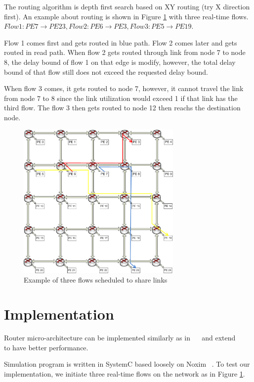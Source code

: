 \documentclass[conference, twocolumn]{IEEEtran}
\theoremstyle{definition}
\begin{document}
The routing algorithm is depth first search based on XY routing (try X
direction first). An example about routing is shown in Figure
\ref{fig:3FlowsEx} with three real-time flows. $Flow 1: PE7 \rightarrow
PE23, Flow 2: PE6 \rightarrow PE3, Flow 3: PE5 \rightarrow PE19$.

Flow 1 comes first and gets routed in blue path. Flow 2 comes later and gets
routed in read path.  When flow 2 gets routed through link from node 7 to node
8, the delay bound of flow 1 on that edge is modify, however, the total delay
bound of that flow still does not exceed the requested delay bound.

When flow 3 comes, it gets routed to node 7, however, it cannot travel the
link from node 7 to 8 since the link utilization would exceed 1 if that link
has the third flow. The flow 3 then gets routed to node 12 then reachs the
destination node.

\begin{figure}[htp]
\centering
\includegraphics[width=8cm]{pics/Example.png}
\caption[Three flows example.]
{Example of three flows scheduled to share links}\label{fig:3FlowsEx}
\end{figure}

\section{Implementation}
Router micro-architecture can be implemented similarly as in
~\cite{Rexford98arouter}~\cite{ZhangService} and extend
~\cite{PehDelayModel}~\cite{PehSpecPipeR} to have better performance.

Simulation program is written in SystemC based loosely on Noxim ~\cite{Noxim}.
To test our implementation, we initiate three real-time flows on the network as
in Figure \ref{fig:3FlowsEx}.
\end{document}
